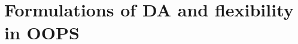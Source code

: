 \documentclass[9pt]{beamer}
\newcommand{\op}[1]{\mathrm{\mathbf{#1}}}
\renewcommand{\vec}[1]{\mathrm{\mathbf{#1}}}
\begin{document}


%

\section{Formulations of DA and flexibility in OOPS}



\end{document}
